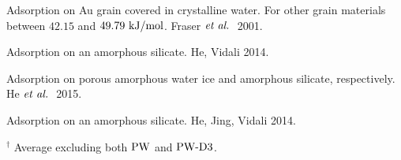 \begin{table}[ht]
\begin{adjustbox}{width=1.0\textwidth,center}
\begin{threeparttable}
    \begin{tablenotes}
    \item[\fakefna] Adsorption on Au grain covered in crystalline water.
    For other grain materials between $42.15$ and $49.79~\text {kJ/mol}$. Fraser $\emph{et al.}~$
    2001.\cite{Fraser2001}
    \item[\fakefnb] Adsorption on an amorphous silicate. He, Vidali 2014.
    \cite{HeVidali2014}
    \item[\fakefnc] Adsorption on porous amorphous water ice and amorphous
    silicate, respectively. He $\emph{et al.}~$ 2015. \cite{He2015}
    \item[\fakefnd] Adsorption on an amorphous silicate. He, Jing, Vidali
    2014. \cite{HeJingVidali2014}
    \item[$^\dagger$] Average excluding both $\text{PW}$ and $\text{PW}\text{-D3}$.
    \end{tablenotes}
    \end{threeparttable}
  \label{Tab:Ads:AdsForFuncs}%
  \end{adjustbox}
\end{table}%

